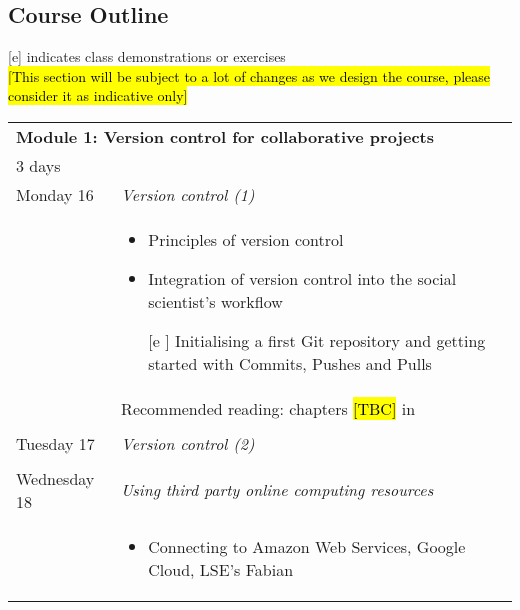 \documentclass{amsart}
\theoremstyle{definition}
\theoremstyle{remark}
\numberwithin{equation}{section}
\begin{document}
\subsection*{Course Outline}

[e] indicates class demonstrations or exercises\\

\hl{[This section will be subject to a lot of changes as we design the course, please consider it as indicative only]} \\

\begin{center}
    \begin{tabular}{| p{3cm} | p{12cm} |}
    \hline
    \multicolumn{2}{|l|}{\textbf{Module 1: Version control for collaborative projects}} \\
    \multicolumn{2}{|l|}{3 days} \\
    \hline
       Monday 16  & \textit{Version control (1)} \\
            & \begin{itemize}
                \item Principles of version control
                \item Integration of version control into the social scientist's workflow
                \item [[e]] Initialising a first Git repository and getting started with Commits, Pushes and Pulls
            \end{itemize}
            \\
            & Recommended reading: chapters \hl{[TBC]} in \cite{gentzkow2014code} \\
            & \\
       Tuesday 17  & \textit{Version control (2)} \\
            & \\
       Wednesday 18 & \textit{Using third party online computing resources} \\
            & \begin{itemize}
                \item Connecting to Amazon Web Services, Google Cloud, LSE's Fabian
            \end{itemize}
            \\
    \hline
    \end{tabular}
\end{center}
\end{document}
